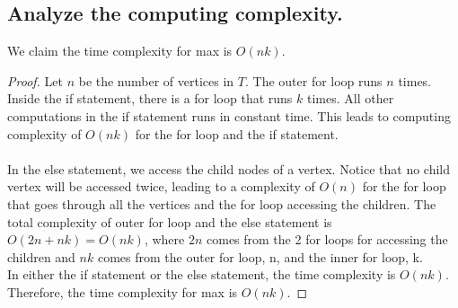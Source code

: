 \documentclass[11pt]{scrartcl}
\begin{document}
\subsection{
	Analyze the computing complexity.
}
We claim the time complexity for max is $O(nk)$.
\begin{proof}
	Let $n$ be the number of vertices in $T$. The outer for loop runs $n$ times. 
	Inside the if statement, there is a for loop that runs $k$ times. All other 
	computations in the if statement runs in constant time. This leads to computing complexity 
	of $O(nk)$ for the for loop and the if statement. \\\-\\
	In the else statement, we access 
	the child nodes of a vertex. Notice that no child vertex will be accessed twice,
	leading to a complexity of $O(n)$ for the for loop that goes through all the vertices 
	and the for loop accessing the children. The total complexity of outer for loop and
	the else statement 
	is $O(2n + nk) = O(nk)$, where $2n$ comes from the 2 for loops for accessing the children 
	and $nk$ comes from the outer for loop, n, and the inner for loop, k. \\
	In either the if statement or the else statement, the time complexity is $O(nk)$.
	Therefore, the time complexity for max is $O(nk)$.
\end{proof}
\end{document}
